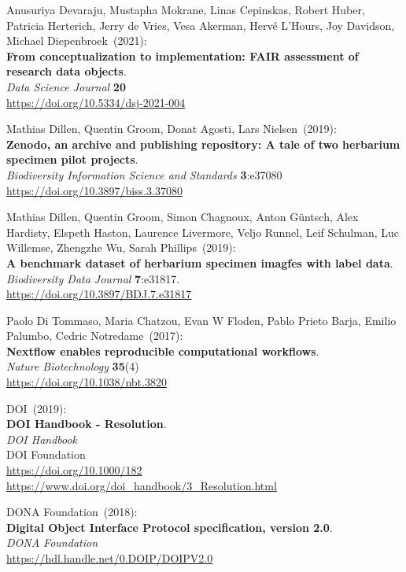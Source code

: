 \begin{thebibliography}{9}
Anusuriya Devaraju, Mustapha Mokrane, Linas Cepinskas, Robert Huber,
Patricia Herterich, Jerry de Vries, Vesa Akerman, Hervé L'Hours, Joy
Davidson, Michael Diepenbroek~(2021): \\
\textbf{From conceptualization to implementation: FAIR assessment of research data objects}. \\
\emph{Data Science Journal} \textbf{20} \\
\url{https://doi.org/10.5334/dsj-2021-004}

Mathias Dillen, Quentin Groom, Donat Agosti, Lars Nielsen~(2019): \\
\textbf{Zenodo, an archive and publishing repository: A tale of two
herbarium specimen pilot projects}.\\
\emph{Biodiversity Information Science and Standards} \textbf{3}:e37080\\
\url{https://doi.org/10.3897/biss.3.37080}

Mathias Dillen, Quentin Groom, Simon Chagnoux, Anton Güntsch, Alex Hardisty, Elspeth Haston, Laurence Livermore, Veljo Runnel, Leif Schulman, Luc Willemse, Zhengzhe Wu, Sarah Phillips~(2019): \\
\textbf{A benchmark dataset of herbarium specimen imagfes with label data}.\\
\emph{Biodiversity Data Journal} \textbf{7}:e31817.\\
\url{https://doi.org/10.3897/BDJ.7.e31817}

Paolo Di Tommaso, Maria Chatzou, Evan W Floden, Pablo Prieto Barja, Emilio Palumbo, Cedric Notredame~(2017): \\
\textbf{Nextflow enables reproducible computational workflows}.\\
\emph{Nature Biotechnology} \textbf{35}(4) \\
\url{https://doi.org/10.1038/nbt.3820}

DOI~(2019): \\
\textbf{{DOI Handbook} - {Resolution}}. \\
\emph{{DOI Handbook}}\\
DOI Foundation\\
\url{https://doi.org/10.1000/182}\\
\url{https://www.doi.org/doi_handbook/3_Resolution.html}

DONA Foundation~(2018): \\
\textbf{Digital Object Interface Protocol specification, version 2.0}.\\
\emph{DONA Foundation}\\
\url{https://hdl.handle.net/0.DOIP/DOIPV2.0}


\end{thebibliography}
